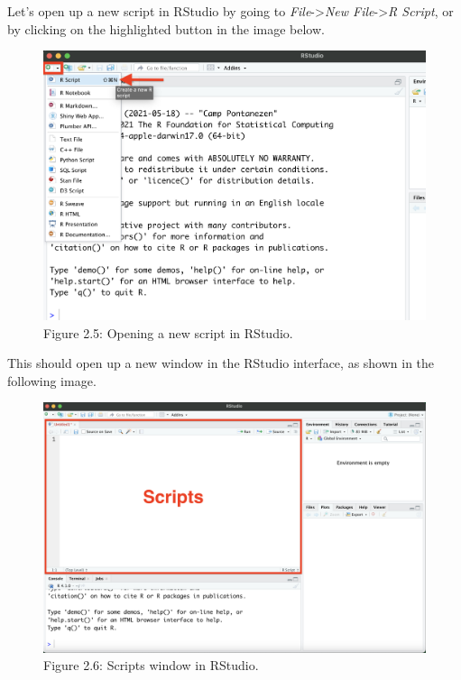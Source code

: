 \documentclass[
]{book}
\begin{document}
Let's open up a new script in RStudio by going to \emph{File}-\textgreater{}\emph{New File}-\textgreater{}\emph{R Script}, or by clicking on the highlighted button in the image below.

\begin{figure}
\centering
\includegraphics[width=1\textwidth,height=\textheight]{images/Rstudio_newscript.png}
\caption{Figure 2.5: Opening a new script in RStudio.}
\end{figure}

This should open up a new window in the RStudio interface, as shown in the following image.

\begin{figure}
\centering
\includegraphics[width=1\textwidth,height=\textheight]{images/Rstudio_scriptwindow.png}
\caption{Figure 2.6: Scripts window in RStudio.}
\end{figure}
\end{document}
